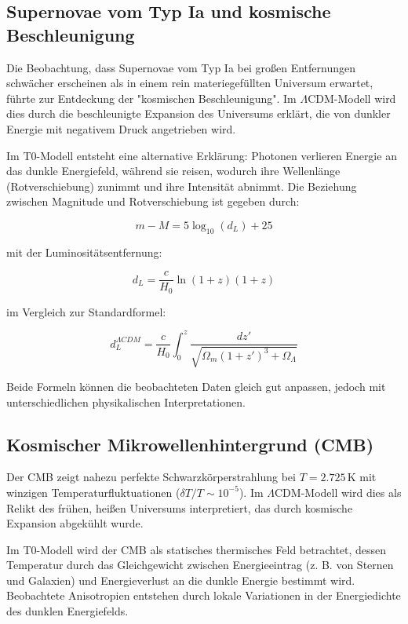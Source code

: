 \documentclass[a4paper,12pt]{article}
\theoremstyle{definition}
\theoremstyle{remark}
\begin{document}
	\subsection{Supernovae vom Typ Ia und kosmische Beschleunigung}
	Die Beobachtung, dass Supernovae vom Typ Ia bei großen Entfernungen schwächer erscheinen als in einem rein materiegefüllten Universum erwartet, führte zur Entdeckung der "kosmischen Beschleunigung". Im $\Lambda$CDM-Modell wird dies durch die beschleunigte Expansion des Universums erklärt, die von dunkler Energie mit negativem Druck angetrieben wird.
	
	Im T0-Modell entsteht eine alternative Erklärung: Photonen verlieren Energie an das dunkle Energiefeld, während sie reisen, wodurch ihre Wellenlänge (Rotverschiebung) zunimmt und ihre Intensität abnimmt. Die Beziehung zwischen Magnitude und Rotverschiebung ist gegeben durch:
	
	\begin{equation}
		m - M = 5 \log_{10}(d_L) + 25
	\end{equation}
	
	mit der Luminositätsentfernung:
	
	\begin{equation}
		d_L = \frac{c}{H_0} \ln(1+z) (1+z)
	\end{equation}
	
	im Vergleich zur Standardformel:
	
	\begin{equation}
		d_L^{\Lambda CDM} = \frac{c}{H_0} \int_0^z \frac{dz'}{\sqrt{\Omega_m(1+z')^3 + \Omega_\Lambda}}
	\end{equation}
	
	Beide Formeln können die beobachteten Daten gleich gut anpassen, jedoch mit unterschiedlichen physikalischen Interpretationen.
	
	\subsection{Kosmischer Mikrowellenhintergrund (CMB)}
	Der CMB zeigt nahezu perfekte Schwarzkörperstrahlung bei $T = 2.725 \, \text{K}$ mit winzigen Temperaturfluktuationen ($\delta T/T \sim 10^{-5}$). Im $\Lambda$CDM-Modell wird dies als Relikt des frühen, heißen Universums interpretiert, das durch kosmische Expansion abgekühlt wurde.
	
	Im T0-Modell wird der CMB als statisches thermisches Feld betrachtet, dessen Temperatur durch das Gleichgewicht zwischen Energieeintrag (z. B. von Sternen und Galaxien) und Energieverlust an die dunkle Energie bestimmt wird. Beobachtete Anisotropien entstehen durch lokale Variationen in der Energiedichte des dunklen Energiefelds.
	
\end{document}
